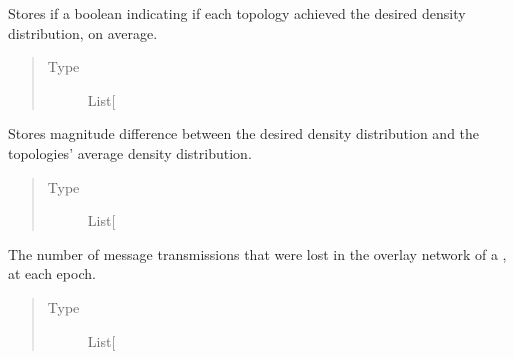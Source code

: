 \documentclass[letterpaper,10pt,english]{sphinxmanual}
\begin{document}
\begin{fulllineitems}

\begin{fulllineitems}
\label{\detokenize{app.domain.helpers:app.domain.helpers.smart_dataclasses.LoggingData.topologies_goal_achieved}}
Stores if a boolean indicating if each topology achieved the
desired density distribution, on average.
\begin{quote}\begin{description}
\item[{Type}] \leavevmode
List{[}\sphinxhref{https://docs.python.org/3.7/library/functions.html\#bool}{bool}{]}

\end{description}\end{quote}

\end{fulllineitems}


\begin{fulllineitems}
\label{\detokenize{app.domain.helpers:app.domain.helpers.smart_dataclasses.LoggingData.topologies_goal_distance}}
Stores magnitude difference between the desired density
distribution and the topologies’ average density distribution.
\begin{quote}\begin{description}
\item[{Type}] \leavevmode
List{[}\sphinxhref{https://docs.python.org/3.7/library/functions.html\#float}{float}{]}

\end{description}\end{quote}

\end{fulllineitems}


\begin{fulllineitems}
\label{\detokenize{app.domain.helpers:app.domain.helpers.smart_dataclasses.LoggingData.transmissions_failed}}
The number of message transmissions that were lost in the
overlay network of a {\hyperref[\detokenize{app.domain:module-app.domain.cluster_groups}]{}}, at each epoch.
\begin{quote}\begin{description}
\item[{Type}] \leavevmode
List{[}\sphinxhref{https://docs.python.org/3.7/library/functions.html\#int}{int}{]}


\end{description}
\end{quote}
\end{fulllineitems}
\end{fulllineitems}
\end{document}
